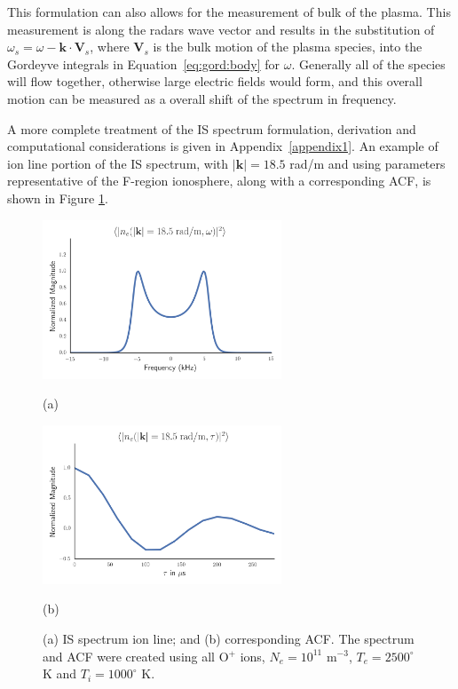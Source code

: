 This formulation can also allows for the measurement of bulk of the plasma. This measurement is along the radars wave vector and results in the substitution of $\omega_s=\omega-\mathbf{k}\cdot\mathbf{V}_s$, where $\mathbf{V}_s$ is the bulk motion of the plasma species, into the Gordeyve integrals in Equation~\ref{eq:gord:body} for $\omega$. Generally all of the species will flow together, otherwise large electric fields would form, and this overall motion can be measured as a overall shift of the spectrum in frequency.

A more complete treatment of the IS spectrum formulation, derivation and computational considerations is given in Appendix~\ref{appendix1}. An example of ion line portion of the IS spectrum, with  $|\mathbf{k}|=18.5$ rad/m and using parameters representative of the F-region ionosphere, along with a corresponding ACF, is shown in Figure \ref{fig:ispecch2}. 

\begin{figure}[htb]
  \begin{minipage}[t]{0.49\linewidth}\centering
    \includegraphics[width=2.8in]{Specion}
    \medskip
    \centerline{(a)}
  \end{minipage}\hfill
  \begin{minipage}[t]{0.49\linewidth}\centering
    \includegraphics[width=2.8in]{acfion}
    \medskip
    \centerline{(b)}
  \end{minipage}
  \caption{(a) IS spectrum ion line; and (b) corresponding ACF. The spectrum and ACF were created using all O$^+$ ions, $N_e = 10^{11}$ m$^{-3}$, $T_e=2500 ^\circ$ K and $T_i=1000 ^\circ$ K.}
  \label{fig:ispecch2}
\end{figure}

